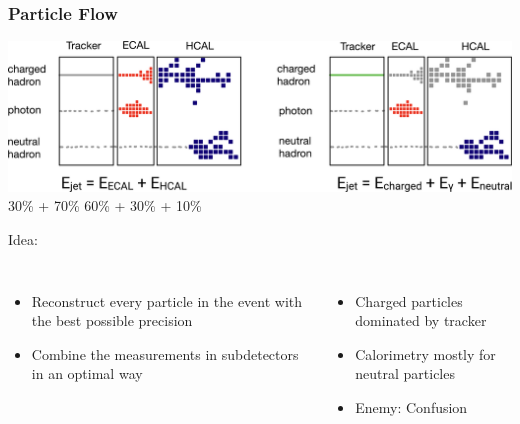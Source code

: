 \documentclass[aspectratio=169]{beamer}
\newcommand{\bluetext}[1]{%
  \textcolor{myBlue}{#1}
}
\begin{document}
\begin{frame}
  \frametitle{Particle Flow}

  \includegraphics[width=\linewidth]{figures/particle_flow_diagram.pdf}
  \vspace{-1.5ex}
  \hspace{6.7em} 30\% + 70\% \hspace{14.5em} 60\% + 30\% + 10\%

  \vspace{-1ex}
  \bluetext{Idea:}
  \begin{columns}[c]
    \begin{itemize}
      \item Reconstruct every particle in the event with the best possible
            precision
      \item Combine the measurements in subdetectors in an optimal way
    \end{itemize}

    \begin{itemize}
      \item Charged particles dominated by tracker
      \item Calorimetry mostly for neutral particles
      \item \bluetext{Enemy: Confusion}
    \end{itemize}
  \end{columns}

\end{frame}
\end{document}

